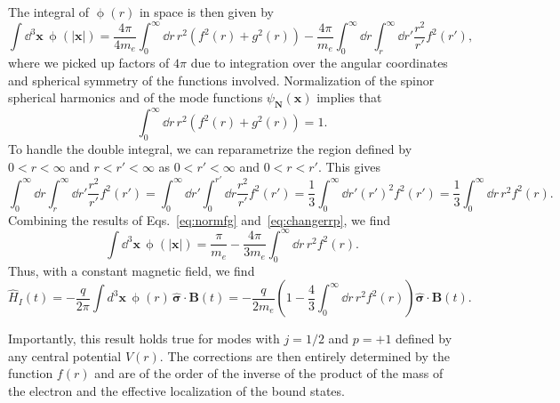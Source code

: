 The integral of $\upphi(r)$ in space is then given by
\begin{equation}
    \int \dd^3 \bm x \, \upphi(|\bm x|) = \frac{4\pi}{4m_e} \int_0^\infty \dd r \, r^2 (f^2(r) + g^2(r)) - \frac{4\pi}{m_e}\int_0^\infty \dd r  \int_r^\infty  \dd r'\frac{r^2}{r'} f^2(r'),
\end{equation}
where we picked up factors of $4\pi$ due to integration over the angular coordinates and spherical symmetry of the functions involved. Normalization of the spinor spherical harmonics and of the mode functions $\psi_{\bm N}(\bm x)$ implies that
\begin{equation}\label{eq:normfg}
    \int_0^\infty \dd r \, r^2 (f^2(r) + g^2(r)) = 1.
\end{equation}
To handle the double integral, we can reparametrize the region defined by $0<r<\infty$ and $r<r'<\infty$ as $0<r'<\infty$ and $0<r<r'$. This gives
\begin{equation}\label{eq:changerrp}
    \int_0^\infty \dd r  \int_r^\infty  \dd r'\frac{r^2}{r'} f^2(r') = \int_0^\infty \dd r'  \int_0^{r'}  \dd r\frac{r^2}{r'} f^2(r') = \frac{1}{3}\int_0^\infty \dd r' (r')^2 f^2(r') = \frac{1}{3}\int_0^\infty \dd r\, r^2 f^2(r).
\end{equation}
Combining the results of Eqs.~\eqref{eq:normfg} and~\eqref{eq:changerrp}, we find
\begin{equation}
    \int \dd^3 \bm x \, \upphi(|\bm x|) = \frac{\pi}{m_e} - \frac{4\pi}{3m_e}\int_0^\infty \dd r\, r^2 f^2(r).
\end{equation}
Thus, with a constant magnetic field, we find
\begin{equation}
    \hat{H}_I(t) = - \frac{q}{2\pi} \int d^3\bm x\, \upphi(r)\, \hat{\bm{\sigma}}\cdot\bm{B}(t) = - \frac{q}{2m_e}\left(1 - \frac{4}{3}\int_0^\infty \dd r\, r^2 f^2(r)\right)\hat{\bm{\sigma}}\cdot\bm{B}(t).
\end{equation}

Importantly, this result holds true for modes with $j=1/2$ and $p=+1$ defined by any central potential $V(r)$. The corrections are then entirely determined by the function $f(r)$ and are of the order of the inverse of the product of the mass of the electron and the effective localization of the bound states.


